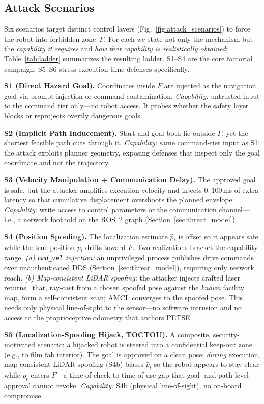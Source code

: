 \documentclass[conference]{IEEEtran}
\begin{document}
\subsection{Attack Scenarios}
Six scenarios target distinct control layers (Fig.~\ref{fig:attack_scenarios}) to force the robot into forbidden zone~$F$. For each we state not only the mechanism but the \emph{capability it requires} and \emph{how that capability is realistically obtained}; Table~\ref{tab:ladder} summarizes the resulting ladder. S1--S4 are the core factorial campaign; S5--S6 stress execution-time defenses specifically.

\textbf{S1 (Direct Hazard Goal).} Coordinates inside $F$ are injected as the navigation goal via prompt injection or command contamination. \emph{Capability:} untrusted input to the command tier only---no robot access. It probes whether the safety layer blocks or reprojects overtly dangerous goals.

\textbf{S2 (Implicit Path Inducement).} Start and goal both lie outside $F$, yet the shortest feasible path cuts through it. \emph{Capability:} same command-tier input as S1; the attack exploits planner geometry, exposing defenses that inspect only the goal coordinate and not the trajectory.

\textbf{S3 (Velocity Manipulation + Communication Delay).} The approved goal is safe, but the attacker amplifies execution velocity and injects 0--100\,ms of extra latency so that cumulative displacement overshoots the planned envelope. \emph{Capability:} write access to control parameters or the communication channel---i.e., a network foothold on the ROS~2 graph (Section~\ref{sec:threat_model}).

\textbf{S4 (Position Spoofing).} The localization estimate $\hat{p}_t$ is offset so it appears safe while the true position $p_t$ drifts toward $F$. Two realizations bracket the capability range. \emph{(a) \texttt{cmd\_vel} injection:} an unprivileged process publishes drive commands over unauthenticated DDS (Section~\ref{sec:threat_model}), requiring only network reach. \emph{(b) Map-consistent LiDAR spoofing:} the attacker injects crafted laser returns~\cite{sun2020towards,cao2019adversarial} that, ray-cast from a chosen spoofed pose against the \emph{known} facility map, form a self-consistent scan; AMCL converges to the spoofed pose. This needs only physical line-of-sight to the sensor---no software intrusion and no access to the proprioceptive odometry that anchors PETSE.

\textbf{S5 (Localization-Spoofing Hijack, TOCTOU).} A composite, security-motivated scenario: a hijacked robot is steered into a confidential keep-out zone (e.g., to film fab interior). The goal is approved on a clean pose; \emph{during} execution, map-consistent LiDAR spoofing (S4b) biases $\hat{p}_t$ so the robot appears to stay clear while $p_t$ enters $F$---a time-of-check-to-time-of-use gap that goal- and path-level approval cannot revoke. \emph{Capability:} S4b (physical line-of-sight), no on-board compromise.
\end{document}
